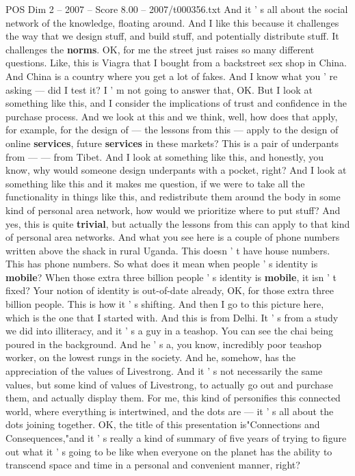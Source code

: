\begin{textsample}{POS Dim 2 – 2007 – Score 8.00 – 2007/t000356.txt}
And it ' s all about the social network of the knowledge, floating around.
And I like this because it challenges the way that we design stuff, and build stuff, and potentially distribute stuff.
It challenges the \textbf{norms}.
OK, for me the street just raises so many different questions.
Like, this is Viagra that I bought from a backstreet sex shop in China.
And China is a country where you get a lot of fakes.
And I know what you ' re asking — did I test it?
I ' m not going to answer that, OK.
But I look at something like this, and I consider the implications of trust and confidence in the purchase process.
And we look at this and we think, well, how does that apply, for example, for the design of — the lessons from this — apply to the design of online \textbf{services}, future \textbf{services} in these markets?
This is a pair of underpants from — — from Tibet.
And I look at something like this, and honestly, you know, why would someone design underpants with a pocket, right?
And I look at something like this and it makes me question, if we were to take all the functionality in things like this, and redistribute them around the body in some kind of personal area network, how would we prioritize where to put stuff?
And yes, this is quite \textbf{trivial}, but actually the lessons from this can apply to that kind of personal area networks.
And what you see here is a couple of phone numbers written above the shack in rural Uganda.
This doesn ' t have house numbers.
This has phone numbers.
So what does it mean when people ' s identity is \textbf{mobile}?
When those extra three billion people ' s identity is \textbf{mobile}, it isn ' t fixed?
Your notion of identity is out-of-date already, OK, for those extra three billion people.
This is how it ' s shifting.
And then I go to this picture here, which is the one that I started with.
And this is from Delhi.
It ' s from a study we did into illiteracy, and it ' s a guy in a teashop.
You can see the chai being poured in the background.
And he ' s a, you know, incredibly poor teashop worker, on the lowest rungs in the society.
And he, somehow, has the appreciation of the values of Livestrong.
And it ' s not necessarily the same values, but some kind of values of Livestrong, to actually go out and purchase them, and actually display them.
For me, this kind of personifies this connected world, where everything is intertwined, and the dots are — it ' s all about the dots joining together.
OK, the title of this presentation is"Connections and Consequences,"and it ' s really a kind of summary of five years of trying to figure out what it ' s going to be like when everyone on the planet has the ability to transcend space and time in a personal and convenient manner, right?

\end{textsample}
